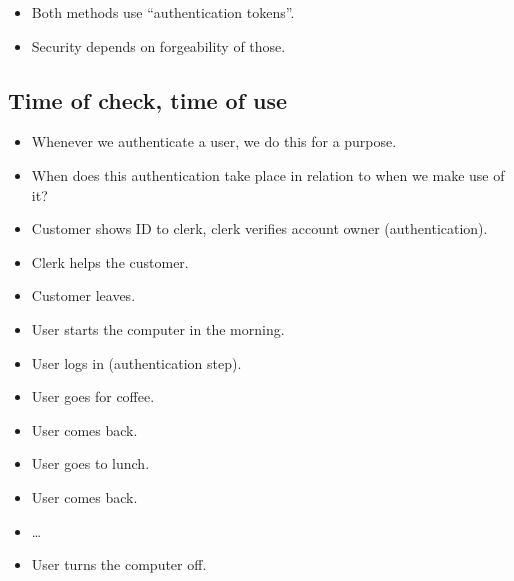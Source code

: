 \begin{frame}
  \begin{remark}
    \begin{itemize}
      \item Both methods use \enquote{authentication tokens}.
      \item Security depends on forgeability of those.
    \end{itemize}
  \end{remark}
\end{frame}

\subsection{Time of check, time of use}

\begin{frame}
  \begin{remark}
    \begin{itemize}
      \item Whenever we authenticate a user, we do this for a purpose.

      \item When does this authentication take place in relation to when we make 
        use of it?
    \end{itemize}
  \end{remark}
\end{frame}

\begin{frame}
  \begin{example}
    \begin{itemize}
      \item Customer shows ID to clerk, clerk verifies account owner 
        (authentication).
      \item Clerk helps the customer.
      \item Customer leaves.
    \end{itemize}
  \end{example}
\end{frame}

\begin{frame}
  \begin{example}
    \begin{itemize}
      \item User starts the computer in the morning.
      \item User logs in (authentication step).
      \item User goes for coffee.
      \item User comes back.
      \item User goes to lunch.
      \item User comes back.
      \item \dots
      \item User turns the computer off.
    \end{itemize}
  \end{example}
\end{frame}

